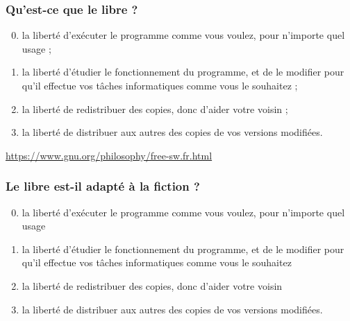 \documentclass[11pt]{beamer}
\begin{document}
\begin{frame}
  \frametitle{Qu'est-ce que le libre ?}
  \begin{enumerate}
    \setcounter{enumi}{-1}
    \item la liberté d'exécuter le programme comme vous voulez, pour n'importe quel usage ;
    \item la liberté d'étudier le fonctionnement du programme, et de
      le modifier pour qu'il  effectue vos tâches informatiques comme vous le souhaitez ;
    \item la liberté de redistribuer des copies, donc d'aider votre
      voisin ;
    \item la liberté de distribuer aux autres des copies de vos versions modifiées.
  \end{enumerate}
\url{https://www.gnu.org/philosophy/free-sw.fr.html}
\end{frame}

\begin{frame}
  \frametitle{Le libre est-il adapté à la fiction ?}
    \begin{enumerate}[<+->]
    \setcounter{enumi}{-1}
  \item
      la liberté d'exécuter le programme comme vous voulez, pour
      n'importe quel usage
    
    \item la liberté d'étudier le fonctionnement du programme, et de
      le modifier pour qu'il  effectue vos tâches informatiques comme
      vous le souhaitez
    \item la liberté de redistribuer des copies, donc d'aider votre
      voisin
    \item la liberté de distribuer aux autres des copies de vos
      versions modifiées.
  \end{enumerate}
\end{frame}
\end{document}
